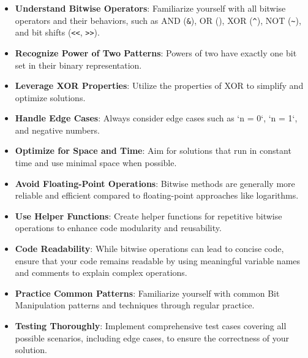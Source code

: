 \begin{itemize}
    \item \textbf{Understand Bitwise Operators}: Familiarize yourself with all bitwise operators and their behaviors, such as AND (\texttt{\&}), OR (\texttt{\textbar}), XOR (\texttt{\^{}}), NOT (\texttt{\~{}}), and bit shifts (\texttt{<<}, \texttt{>>}).
    
    \item \textbf{Recognize Power of Two Patterns}: Powers of two have exactly one bit set in their binary representation.
    
    \item \textbf{Leverage XOR Properties}: Utilize the properties of XOR to simplify and optimize solutions.
    
    \item \textbf{Handle Edge Cases}: Always consider edge cases such as `n = 0`, `n = 1`, and negative numbers.
    
    \item \textbf{Optimize for Space and Time}: Aim for solutions that run in constant time and use minimal space when possible.
    
    \item \textbf{Avoid Floating-Point Operations}: Bitwise methods are generally more reliable and efficient compared to floating-point approaches like logarithms.
    
    \item \textbf{Use Helper Functions}: Create helper functions for repetitive bitwise operations to enhance code modularity and reusability.
    
    \item \textbf{Code Readability}: While bitwise operations can lead to concise code, ensure that your code remains readable by using meaningful variable names and comments to explain complex operations.
    
    \item \textbf{Practice Common Patterns}: Familiarize yourself with common Bit Manipulation patterns and techniques through regular practice.
    
    \item \textbf{Testing Thoroughly}: Implement comprehensive test cases covering all possible scenarios, including edge cases, to ensure the correctness of your solution.
\end{itemize}

